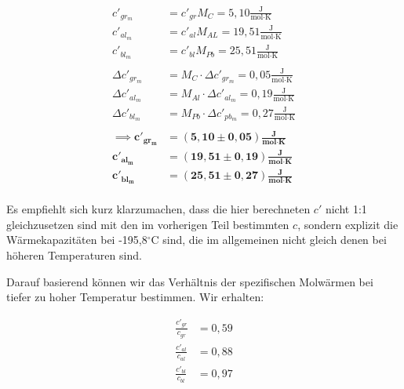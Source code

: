 \documentclass{article}
\begin{document}
\begin{equation}
    \begin{split}
        c'_{gr_m} &= c'_{gr} M_{C} = 5,10 \frac{\text{J}}{\text{mol} \cdot \text{K}} \\
        c'_{al_m} &= c'_{al} M_{AL} = 19,51 \frac{\text{J}}{\text{mol} \cdot \text{K}} \\
        c'_{bl_m} &= c'_{bl} M_{Pb} = 25,51 \frac{\text{J}}{\text{mol} \cdot \text{K}} \\ \\
        \Delta c'_{gr_m} &= M_{C} \cdot \Delta c'_{gr_m} = 0,05 \frac{\text{J}}{\text{mol} \cdot \text{K}} \\
        \Delta c'_{al_m} &= M_{Al} \cdot \Delta c'_{al_m} = 0,19 \frac{\text{J}}{\text{mol} \cdot \text{K}} \\
        \Delta c'_{bl_m} &= M_{Pb} \cdot \Delta c'_{pb_m} = 0,27 \frac{\text{J}}{\text{mol} \cdot \text{K}} \\ \\
        \implies \bm{c'_{gr_m}} &= \bm{(5,10 \pm 0,05)} \frac{\textbf{J}}{\textbf{mol} \cdot \textbf{K}} \\
        \bm{c'_{al_m}} &= \bm{(19,51 \pm 0,19)} \frac{\textbf{J}}{\textbf{mol} \cdot \textbf{K}} \\
        \bm{c'_{bl_m}} &= \bm{(25,51 \pm 0,27)} \frac{\textbf{J}}{\textbf{mol} \cdot \textbf{K}} \\
    \end{split}
\end{equation}

Es empfiehlt sich kurz klarzumachen, dass die hier berechneten $c'$ nicht 1:1 gleichzusetzen sind mit den im vorherigen Teil bestimmten $c$, sondern explizit die Wärmekapazitäten bei -195,8$^\circ$C sind, die im allgemeinen nicht gleich denen bei höheren Temperaturen sind. 

\newpage
Darauf basierend können wir das Verhältnis der spezifischen Molwärmen bei tiefer zu hoher Temperatur bestimmen. Wir erhalten:

\begin{equation}
    \begin{split}
        \frac{c'_{gr}}{c_{gr}} &= 0,59 \\
        \frac{c'_{al}}{c_{al}} &= 0,88 \\
        \frac{c'_{bl}}{c_{bl}} &= 0,97 \\
    \end{split}
\end{equation}
\end{document}
